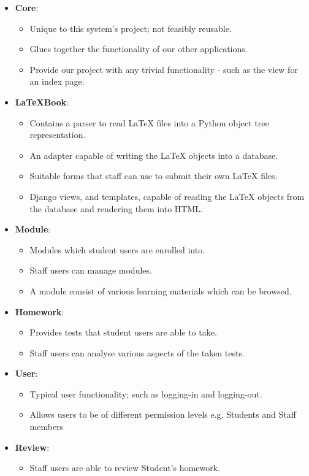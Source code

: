 		\begin{itemize}
			\item \textbf{Core}:
				\begin{itemize}
					\item Unique to this system's project; not feasibly reusable.
					\item Glues together the functionality of our other applications.
					\item Provide our project with any trivial functionality - such as the view for an index page.
				\end{itemize}

			\item \textbf{LaTeXBook}:
				\begin{itemize}
					\item Contains a parser to read LaTeX files into a Python object tree representation.
					\item An adapter capable of writing the LaTeX objects into a database.
					\item Suitable forms that staff can use to submit their own LaTeX files.
					\item Django views, and templates, capable of reading the LaTeX objects from the database and rendering them into HTML.
				\end{itemize}
				
			\item \textbf{Module}:
				\begin{itemize}
					\item Modules which student users are enrolled into.
					\item Staff users can manage modules.
					\item A module consist of various learning materials which can be browsed.
				\end{itemize} 

			\item \textbf{Homework}:
				\begin{itemize}
					\item Provides tests that student users are able to take.
					\item Staff users can analyse various aspects of the taken tests.
				\end{itemize}
			
			\item \textbf{User}:
			\begin{itemize}
				\item Typical user functionality; such as logging-in and logging-out.
				\item Allows users to be of different permission levels e.g. Students and Staff members
			\end{itemize} 
			
			\item \textbf{Review}:
			\begin{itemize}
				\item Staff users are able to review Student's homework.
			\end{itemize} 
			
		\end{itemize}

